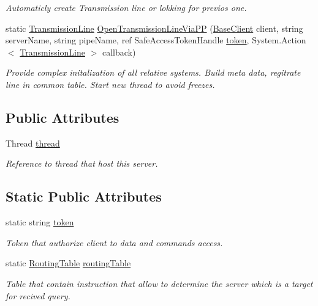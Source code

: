 \begin{DoxyCompactItemize}
\begin{DoxyCompactList}\small\item\em Automaticly create Transmission line or lokking for previos one. \end{DoxyCompactList}\item 
static \mbox{\hyperlink{class_pipes_provider_1_1_client_1_1_transmission_line}{Transmission\+Line}} \mbox{\hyperlink{class_uniform_client_1_1_base_client_a79c6e490b20b4b8c649af33926e20017}{Open\+Transmission\+Line\+Via\+PP}} (\mbox{\hyperlink{class_uniform_client_1_1_base_client}{Base\+Client}} client, string server\+Name, string pipe\+Name, ref Safe\+Access\+Token\+Handle \mbox{\hyperlink{class_uniform_client_1_1_base_client_ad99bcf3d1afeed6eadca7035c926d2b7}{token}}, System.\+Action$<$ \mbox{\hyperlink{class_pipes_provider_1_1_client_1_1_transmission_line}{Transmission\+Line}} $>$ callback)
\begin{DoxyCompactList}\small\item\em Provide complex initalization of all relative systems. Build meta data, regitrate line in common table. Start new thread to avoid freezes. \end{DoxyCompactList}\end{DoxyCompactItemize}
\subsection*{Public Attributes}
\begin{DoxyCompactItemize}
\item 
Thread \mbox{\hyperlink{class_uniform_client_1_1_base_client_a458271823ca5e21612c0947e1db695a0}{thread}}
\begin{DoxyCompactList}\small\item\em Reference to thread that host this server. \end{DoxyCompactList}\end{DoxyCompactItemize}
\subsection*{Static Public Attributes}
\begin{DoxyCompactItemize}
\item 
static string \mbox{\hyperlink{class_uniform_client_1_1_base_client_ad99bcf3d1afeed6eadca7035c926d2b7}{token}}
\begin{DoxyCompactList}\small\item\em Token that authorize client to data and commands access. \end{DoxyCompactList}\item 
static \mbox{\hyperlink{class_pipes_provider_1_1_networking_1_1_routing_1_1_routing_table}{Routing\+Table}} \mbox{\hyperlink{class_uniform_client_1_1_base_client_a33b34ea9a2d7b4b8e26af767ab2897cf}{routing\+Table}}
\begin{DoxyCompactList}\small\item\em Table that contain instruction that allow to determine the server which is a target for recived query. \end{DoxyCompactList}\end{DoxyCompactItemize}
